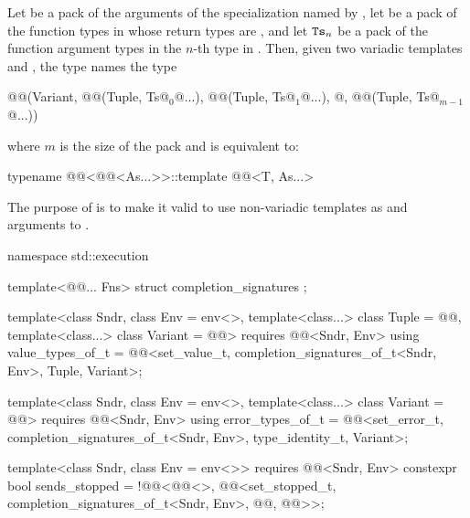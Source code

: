 \pnum
Let  be a pack of the arguments of
the  specialization named by ,
let  be a pack of the function types in 
whose return types are , and
let $\texttt{\protect Ts}_n$ be a pack of the function argument types
in the $n$-th type in .
Then, given two variadic templates  and ,
the type 
names the type
\begin{codeblock}
@@(Variant, @@(Tuple, Ts@$_0$@...),
                    @\itcorr[1]@(Tuple, Ts@$_1$@...),
                    @\itcorr[1]\ldots@,
                    @\itcorr[1]@(Tuple, Ts@$_{m-1}$@...))
\end{codeblock}
where $m$ is the size of the pack  and
 is equivalent to:
\begin{codeblock}
typename @@<@@<As...>>::template @@<T, As...>
\end{codeblock}

\pnum
\begin{note}
The purpose of  is to make it valid
to use non-variadic templates as  and  arguments
to .
\end{note}

\pnum
\begin{codeblock}
namespace std::execution {
  template<@@... Fns>
    struct completion_signatures {};

  template<class Sndr, class Env = env<>,
           template<class...> class Tuple = @@,
           template<class...> class Variant = @@>
      requires @@<Sndr, Env>
    using value_types_of_t =
      @@<set_value_t, completion_signatures_of_t<Sndr, Env>, Tuple, Variant>;

  template<class Sndr, class Env = env<>,
           template<class...> class Variant = @@>
      requires @@<Sndr, Env>
    using error_types_of_t =
      @@<set_error_t, completion_signatures_of_t<Sndr, Env>,
                        type_identity_t, Variant>;

  template<class Sndr, class Env = env<>>
      requires @@<Sndr, Env>
    constexpr bool sends_stopped =
      !@@<@@<>,
               @@<set_stopped_t, completion_signatures_of_t<Sndr, Env>,
                                 @@, @@>>;
}
\end{codeblock}

